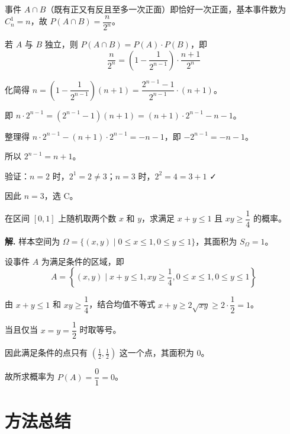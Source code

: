 \documentclass[11pt]{ctexrep}
\begin{document}
事件 $A \cap B$（既有正又有反且至多一次正面）即恰好一次正面，基本事件数为 $C_n^1 = n$，故 $P(A \cap B) = \dfrac{n}{2^n}$。

若 $A$ 与 $B$ 独立，则 $P(A \cap B) = P(A) \cdot P(B)$，即
\[
    \frac{n}{2^n} = \left(1 - \frac{1}{2^{n-1}}\right) \cdot \frac{n + 1}{2^n}
\]

化简得 $n = \left(1 - \dfrac{1}{2^{n-1}}\right)(n + 1) = \dfrac{2^{n-1} - 1}{2^{n-1}} \cdot (n + 1)$。

即 $n \cdot 2^{n-1} = (2^{n-1} - 1)(n + 1) = (n + 1) \cdot 2^{n-1} - n - 1$。

整理得 $n \cdot 2^{n-1} - (n + 1) \cdot 2^{n-1} = -n - 1$，即 $-2^{n-1} = -n - 1$。

所以 $2^{n-1} = n + 1$。

验证：$n = 2$ 时，$2^1 = 2 \neq 3$；$n = 3$ 时，$2^2 = 4 = 3 + 1$ ✓

因此 $n = 3$，选 C。

\begin{realexam}[练习]
    在区间 $[0, 1]$ 上随机取两个数 $x$ 和 $y$，求满足 $x + y \leq 1$ 且 $xy \geq \dfrac{1}{4}$ 的概率。
\end{realexam}

\textbf{解.} 样本空间为 $\Omega = \{(x, y) \mid 0 \leq x \leq 1, 0 \leq y \leq 1\}$，其面积为 $S_\Omega = 1$。

设事件 $A$ 为满足条件的区域，即
\[
    A = \left\{(x, y) \mid x + y \leq 1, xy \geq \frac{1}{4}, 0 \leq x \leq 1, 0 \leq y \leq 1\right\}
\]

由 $x + y \leq 1$ 和 $xy \geq \dfrac{1}{4}$，结合均值不等式 $x + y \geq 2\sqrt{xy} \geq 2 \cdot \dfrac{1}{2} = 1$。

当且仅当 $x = y = \dfrac{1}{2}$ 时取等号。

因此满足条件的点只有 $(\frac{1}{2}, \frac{1}{2})$ 这一个点，其面积为 $0$。

故所求概率为 $P(A) = \dfrac{0}{1} = 0$。

\section*{方法总结}
\end{document}
